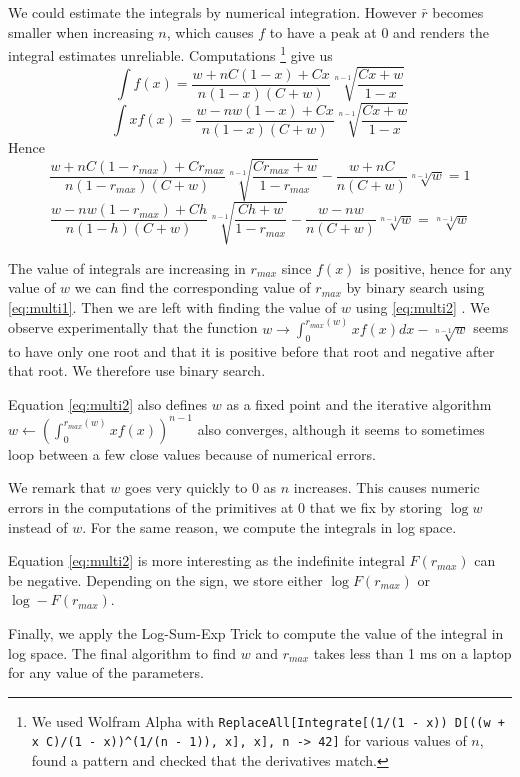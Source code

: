 \documentclass[preprint,12pt,authoryear,doubleblind]{elsarticle}
\theoremstyle{definition}
\begin{document}
We could estimate the integrals by numerical integration. However $\bar r$ becomes smaller when increasing $n$, which causes $f$ to have a peak at $0$ and renders the integral estimates unreliable.
Computations \footnote{We used Wolfram Alpha with \texttt{ReplaceAll[Integrate[(1/(1 - x)) D[((w + x C)/(1 - x))\^{}(1/(n - 1)), x], x], {n -> 42}]} for various values of $n$, found a pattern and checked that the derivatives match.} give us 
$$\int f(x) = \frac{w + nC(1-x) + Cx}{n (1 - x)(C+w)} \sqrt[n-1]{\frac{Cx + w}{1-x}}$$
$$\int x f(x) = \frac{w - n w  (1-x) + Cx}{n (1-x)(C+w)}\sqrt[n-1]{\frac{Cx+w}{1-x}}$$
Hence
\begin{equation}
\label{eq:multi1}
\frac{w + nC(1-{r_{max}}) + C{r_{max}}}{n (1 - {r_{max}})(C+w)} \sqrt[n-1]{\frac{C{r_{max}} + w}{1-{r_{max}}}} -  \frac{w + nC}{n (C+w)} \sqrt[n-1]{w} = 1
\end{equation}
\begin{equation}
\label{eq:multi2}
\frac{w - n w  (1-{r_{max}}) + Ch}{n (1-h)(C+w)}\sqrt[n-1]{\frac{Ch+w}{1-{r_{max}}}} - \frac{w - n w}{n (C+w)}\sqrt[n-1]{w} = \sqrt[n-1]{w}
\end{equation}

The value of integrals are increasing in ${r_{max}}$ since $f(x)$ is positive, hence for any value of $w$ we can find the corresponding value of ${r_{max}}$ by binary search using \eqref{eq:multi1}. Then we are left with finding the value of $w$ using \eqref{eq:multi2} . We observe experimentally that the function $w \rightarrow \int_0^{{r_{max}}(w)}xf(x)dx - \sqrt[n-1]{w}$ seems to have only one root and that it is positive before that root and negative after that root. We therefore use binary search.

Equation \eqref{eq:multi2} also defines $w$ as a fixed point and the iterative algorithm $w \leftarrow \left(\int_0^{{r_{max}}(w)}x f(x)\right)^{n-1}$ also converges, although it seems to sometimes loop between a few close values because of numerical errors.

We remark that $w$ goes very quickly to $0$ as $n$ increases. This causes numeric errors in the computations of the primitives at $0$ that we fix by storing $\log w$ instead of $w$.  For the same reason, we compute the integrals in log space.

Equation \eqref{eq:multi2} is more interesting as the indefinite integral $F({r_{max}})$ can be negative. Depending on the sign, we store either $\log F({r_{max}})$ or $\log -F({r_{max}})$.

Finally, we apply the Log-Sum-Exp Trick to compute the value of the integral in log space. The final algorithm to find $w$ and ${r_{max}}$ takes less than 1 ms on a laptop for any value of the parameters.
\end{document}
